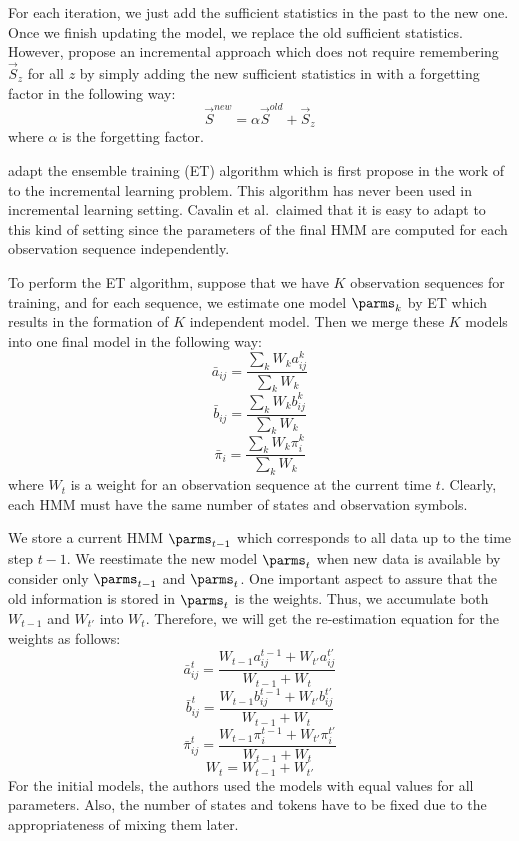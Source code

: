 For each iteration, we just add the sufficient statistics in the past
to the new one. Once we finish updating the model, we replace the old
sufficient statistics. However, 
propose an incremental approach which does not require remembering
$\vec{S}_z$ for all $z$ by simply adding the new sufficient statistics
in with a forgetting factor in the following way:
\[
	\vec{S}^{new} = \alpha \vec{S}^{old} + \vec{S}_z
\]
where $\alpha$ is the forgetting factor.

 adapt the ensemble training (ET)
algorithm which is first propose in the work
of  to the incremental learning problem. This
algorithm has never been used in incremental learning setting. Cavalin
et al.\ claimed that it is easy to adapt to this kind of setting since
the parameters of the final HMM are computed for each observation
sequence independently.

To perform the ET algorithm, suppose that we have $K$ observation
sequences for training, and for each sequence, we estimate one model
$\parms_k$ by ET which results in the formation of $K$ independent
model. Then we merge these $K$ models into one final model in the
following way:
\[
	\bar a_{ij}  = \frac{{\sum\nolimits_k {W_k a_{ij}^k } }}{{\sum\nolimits_k 
	{W_k } }}
\]
\[
	\bar b_{ij}  = \frac{{\sum\nolimits_k {W_k b_{ij}^k } }}{{\sum\nolimits_k 
	{W_k } }}
\]
\[
	\bar \pi _i  = \frac{{\sum\nolimits_k {W_k \pi _i^k } }}{{\sum\nolimits_k 
	{W_k } }}
\]
where $W_t$ is a weight for an observation sequence at the current
time $t$. Clearly, each HMM must have the same number of states and
observation symbols.

We store a current HMM $\parms_{t-1}$ which corresponds to all data up
to the time step $t-1$. We reestimate the new model $\parms_t$ when
new data is available by consider only $\parms_{t-1}$ and
$\parms_t$. One important aspect to assure that the old information is
stored in $\parms_t$ is the weights. Thus, we accumulate both
$W_{t-1}$ and $W_{t'}$ into $W_{t}$. Therefore, we will get the
re-estimation equation for the weights as follows:
\[
	\bar a_{ij}^t  = \frac{{W_{t - 1} a_{ij}^{t - 1} + W_{t'} a_{ij}^{t'}}}
	{{W_{t - 1}  + W_t }}
\]
\[
	\bar b_{ij}^t  = \frac{{W_{t - 1} b_{ij}^{t - 1} + W_{t'} b_{ij}^{t'}}}
	{{W_{t - 1}  + W_t }}
\]
\[
	\bar \pi _{ij}^t  = \frac{{W_{t - 1} \pi _i^{t - 1} + W_{t'} \pi _i^{t'}}}
	{{W_{t - 1}  + W_t }}
\]
\[
	W_t  = W_{t - 1} + W_{t'} 
\]
For the initial models, the authors used the models with equal values
for all parameters. Also, the number of states and tokens have to be
fixed due to the appropriateness of mixing them later.

